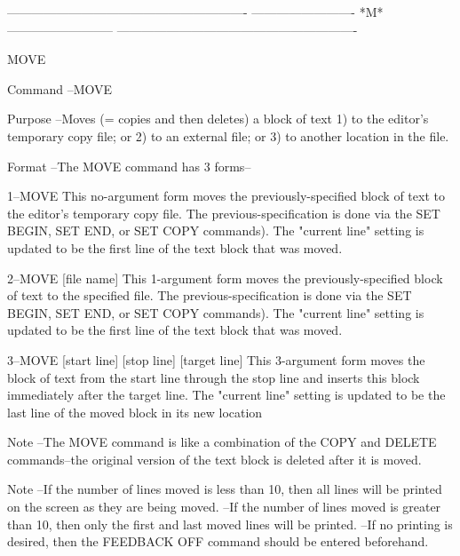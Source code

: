  
 
 
 
 
----------------------------------------------------------
-------------------------  *M*  --------------------------
----------------------------------------------------------
 
MOVE
 
Command --MOVE
 
Purpose --Moves (= copies and then deletes) a block of text
             1) to the editor's temporary copy file; or
             2) to an external file; or
             3) to another location in the file.
 
Format  --The MOVE command has 3 forms--
 
       1--MOVE
          This no-argument form moves the
          previously-specified block of text
          to the editor's temporary copy file.
          The previous-specification is done via the
          SET BEGIN, SET END, or SET COPY  commands).
          The "current line" setting is updated to
          be the first line of the text block that
          was moved.
 
       2--MOVE    [file name]
          This 1-argument form moves the
          previously-specified block of text
          to the specified file.
          The previous-specification is done via the
          SET BEGIN, SET END, or SET COPY  commands).
          The "current line" setting is updated to
          be the first line of the text block that
          was moved.
 
       3--MOVE   [start line]   [stop line]   [target line]
          This 3-argument form moves the block of text
          from the    start line   through the    stop line
          and inserts this block immediately after
          the    target line.
          The "current line" setting is updated to
          be the last line of the moved block in its
          new location
 
Note    --The MOVE command is like a combination of
          the COPY and DELETE commands--the original
          version of the text block is deleted after
          it is moved.
 
Note    --If the number of lines moved is
          less than 10, then all lines
          will be printed on the screen
          as they are being moved.
        --If the number of lines moved
          is greater than 10, then only the
          first and last moved lines will
          be printed.
        --If no printing is desired, then
          the FEEDBACK OFF command should
          be entered beforehand.
 
